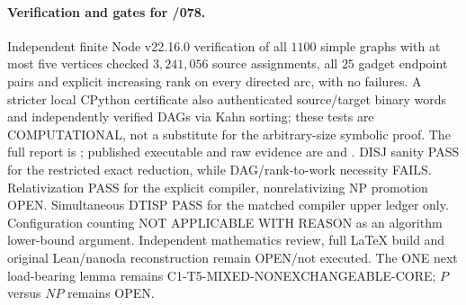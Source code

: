 \documentclass[11pt]{article}
\begin{document}
\paragraph{Verification and gates for /078.}
Independent finite Node v22.16.0 verification
of all $1100$ simple graphs with at most five vertices
checked $3{,}241{,}056$ source assignments, all $25$
gadget endpoint pairs and explicit increasing
rank on every directed arc, with no failures.
A stricter local CPython certificate also
authenticated source/target binary words and
independently verified DAGs via Kahn sorting;
these tests are COMPUTATIONAL, not a substitute
for the arbitrary-size symbolic proof.
The full report is
;
published executable and raw evidence are
and .
DISJ sanity PASS for the restricted exact reduction,
while DAG/rank-to-work necessity FAILS.
Relativization PASS for the explicit compiler,
nonrelativizing NP promotion OPEN.
Simultaneous DTISP PASS for the matched compiler
upper ledger only. Configuration counting
NOT APPLICABLE WITH REASON as an algorithm
lower-bound argument. Independent mathematics
review, full \LaTeX{} build and original
Lean/nanoda reconstruction remain OPEN/not executed.
The ONE next load-bearing lemma remains
C1-T5-MIXED-NONEXCHANGEABLE-CORE;
$P$ versus $NP$ remains OPEN.
\end{document}
